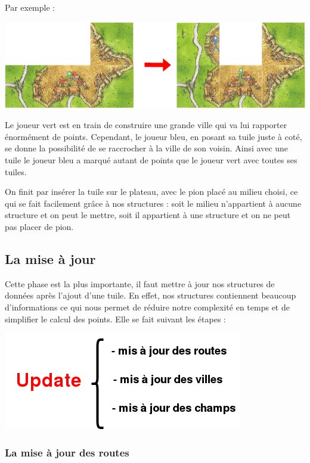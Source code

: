 Par exemple :

\includegraphics[scale=0.5]{Parasite.png}

Le joueur vert est en train de construire une grande ville qui va lui rapporter énormément de points. Cependant, le joueur bleu, en posant sa tuile juste à coté, se donne la possibilité de se raccrocher à la ville de son voisin. Ainsi avec une tuile le joueur bleu a marqué autant de points que le joueur vert avec toutes ses tuiles. \newline


On finit par insérer la tuile sur le plateau, avec le pion placé au milieu choisi, ce qui se fait facilement grâce à nos structures : soit le milieu n'appartient à aucune structure et on peut le mettre, soit il appartient à une structure et on ne peut pas placer de pion.

\subsection{La mise à jour}

Cette phase est la plus importante, il faut mettre à jour nos structures de données après l'ajout d'une tuile. En effet, nos structures contiennent beaucoup d'informations ce qui nous permet de réduire notre complexité en temps et de simplifier le calcul des points. Elle se fait suivant les étapes :

\vspace{0.5cm}

\includegraphics[scale=0.75]{Update.png}

\vspace{0.5cm}
\subsubsection{La mise à jour des routes}


